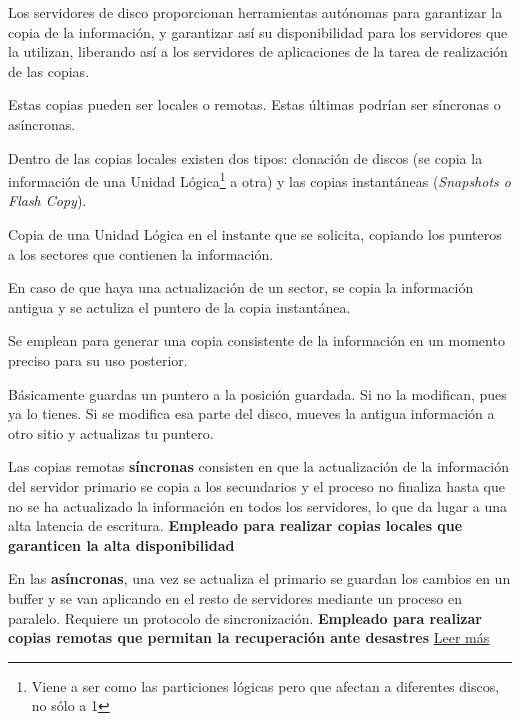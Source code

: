 Los servidores de disco proporcionan herramientas autónomas para garantizar la copia de la información, y garantizar así su disponibilidad para los servidores que la utilizan, liberando así a los servidores de aplicaciones de la tarea de realización de las copias.

Estas copias pueden ser locales o remotas. Estas últimas podrían ser síncronas o asíncronas.

Dentro de las copias locales existen dos tipos: clonación de discos (se copia la información de una Unidad Lógica\footnote{Viene a ser como las particiones lógicas pero que afectan a diferentes discos, no sólo a 1} a otra) y las copias instantáneas (\textit{Snapshots o Flash Copy}).

\begin{defn}
Copia de una Unidad Lógica en el instante que se solicita, copiando los punteros a los sectores que contienen la información.

En caso de que haya una actualización de un sector, se copia la información antigua y se actuliza el puntero de la copia instantánea.

Se emplean para generar una copia consistente de la información en un momento preciso para su uso posterior.

\obs Básicamente guardas un puntero a la posición guardada. Si no la modifican, pues ya lo tienes. Si se modifica esa parte del disco, mueves la antigua información a otro sitio y actualizas tu puntero.
\end{defn}

Las copias remotas \textbf{síncronas} consisten en que la actualización de la información del servidor primario se copia a los secundarios y el proceso no finaliza hasta que no se ha actualizado la información en todos los servidores, lo que da lugar a una alta latencia de escritura. \textbf{Empleado para realizar copias locales que garanticen la alta disponibilidad}

En las \textbf{asíncronas}, una vez se actualiza el primario se guardan los cambios en un buffer y se van aplicando en el resto de servidores mediante un proceso en paralelo. Requiere un protocolo de sincronización. \textbf{Empleado para realizar copias remotas que permitan la recuperación ante desastres} \href{http://searchdatacenter.techtarget.com/es/consejo/Ventajas-e-inconvenientes-de-la-replicacion-remota-en-la-recuperacion-de-desastres}{Leer más}


